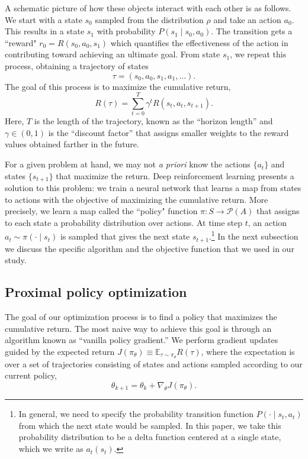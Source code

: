 A schematic picture of how these objects interact with each other is as follows. We start with a state $s_0$ sampled from the distribution $\rho$ and take an action $a_0$. This results in a state $s_1$ with probability $P(s_1 \mid s_0, a_0) $. The transition gets a ``reward" $r_0 = R(s_0, a_0, s_1)$ which quantifies the effectiveness of the action in contributing toward achieving an ultimate goal. From state $s_1$, we repeat this process, obtaining a trajectory of states
\[
\tau = \left( s_0, a_0, s_1, a_1, \dots \right).
\]
The goal of this process is to maximize the cumulative return,
\[
R(\tau) = \sum\limits_{t=0}^{T} \gamma^t R(s_t, a_t, s_{t+1}).
\]
Here, $T$ is the length of the trajectory, known as the ``horizon length'' and $\gamma \in \left(0, 1 \right)$ is the ``discount factor'' that assigns smaller weights to the reward values obtained farther in the future.

For a given problem at hand, we may not \textit{a priori} know the actions $\{a_t\}$ and states $\{s_{t+1}\}$ that maximize the return. Deep reinforcement learning presents a solution to this problem: we train a neural network that learns a map from states to actions with the objective of maximizing the cumulative return. More precisely, we learn a map called the ``policy" function $\pi \colon S \to \mathcal{P}(A)$ that assigns to each state a probability distribution over actions. At time step $t$, an action $a_t \sim \pi(\cdot \mid s_t)$ is sampled that gives the next state $s_{t+1}$.\footnote{
In general, we need to specify the probability transition function $P(\cdot \mid s_t, a_t)$ from which the next state would be sampled. In this paper, we take this probability distribution to be a delta function centered at a single state, which we write as $a_t(s_t)$.}
In the next subsection we discuss the specific algorithm and the objective function that we used in our study.

\subsection{Proximal policy optimization} \label{sec:ppo}

The goal of our optimization process is to find a policy that maximizes the cumulative return. The most naive way to achieve this goal is through an algorithm known as ``vanilla policy gradient.''
We perform gradient updates guided by the expected return $J(\pi_\theta) \equiv \mathbb{E}_{\tau \sim \pi_\theta} R(\tau)$, where the expectation is over a set of trajectories consisting of states and actions sampled according to our current policy,
\[
\theta_{k+1} = \theta_k + \nabla_\theta J(\pi_\theta).
\]

